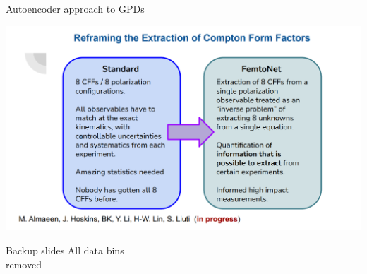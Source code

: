 \documentclass[aspectratio=169]{beamer}
\newcommand*{\myfont}{\fontfamily{lmtt}\selectfont}
\begin{document}
\begin{frame}{Autoencoder approach to GPDs}

  \includegraphics[scale=0.52832]{janres/vain2.png}
\end{frame}


%
%
%



%    







\begin{frame}{Backup slides}
\centering
All data bins\\
removed
\end{frame}
\end{document}
